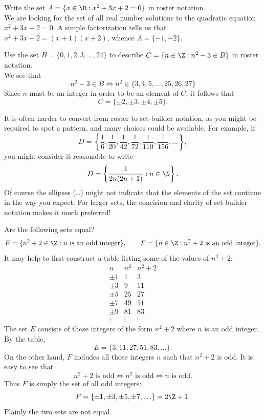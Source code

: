 \begin{examples}
  \item Write the set $A=\{x\in\R:x^2+3x+2=0\}$ in roster notation.\\[5pt]
	We are looking for the set of all real number solutions to the quadratic equation $x^2+3x+2=0$. A simple factorization tells us that $x^2+3x+2=(x+1)(x+2)$, whence $A=\{-1,-2\}$.
  \item Use the set $B=\{0,1,2,3,\ldots,24\}$ to describe $C=\{n\in\Z:n^2-3\in B\}$ in roster notation.\\[5pt]
  We see that
  \[n^2-3\in B\iff n^2\in\{3,4,5,\ldots,25,26,27\}\]
  Since $n$ must be an integer in order to be an element of $C$, it follows that
  \[C=\{\pm 2,\pm 3,\pm 4,\pm 5\}.\]
  \item It is often harder to convert from roster to set-builder notation, as you might be required to spot a pattern, and many choices could be available. For example, if
  \[D=\left\{\frac 16,\frac 1{20},\frac 1{42},\frac 1{72},\frac 1{110},\frac 1{156},\ldots\right\},\]
  you might consider it reasonable to write
  \[D=\left\{\frac 1{2n(2n+1)}:n\in\N\right\}.\]
  Of course the ellipses (\ldots) might not indicate that the elements of the set continue in the way you expect. For larger sets, the concision and clarity of set-builder notation makes it much preferred!
  \item Are the following sets equal?
  \[E=\{n^2+2\in\Z:\text{$n$ is an odd integer}\},\qquad F=\{n\in\Z:n^2+2\text{ is an odd integer}\}.\]
  It may help to first construct a table listing some of the values of $n^2+2$:
  \[\begin{array}{c|c|c}
  n&n^2&n^2+2\\\hline
  \pm 1&1&3\\
  \pm 3&9&11\\
  \pm 5&25&27\\
  \pm 7&49&51\\
  \pm 9&81&83\\[-5pt]
  \vdots&\vdots&\vdots
  \end{array}\]
  The set $E$ consists of those integers of the form $n^2+2$ where $n$ is an odd integer. By the table,
  \[E=\{3,11,27,51,83,\ldots\}.\]
  On the other hand, $F$ includes all those integers $n$ such that $n^2+2$ is odd. It is easy to see that
  \[n^2+2\text{ is odd}\iff n^2\text{ is odd}\iff n\text{ is odd.}\]
  Thus $F$ is simply the set of all odd integers:
  \[F=\{\pm 1,\pm 3,\pm 5,\pm 7,\ldots\}=2\Z+1.\]
  Plainly the two sets are not equal.
\end{examples}



